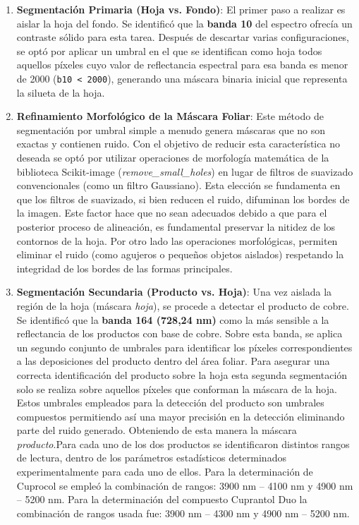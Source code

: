 \begin{enumerate}
    \item \textbf{Segmentación Primaria (Hoja vs. Fondo)}: El primer paso a realizar es aislar la hoja del fondo. Se identificó que la \textbf{banda 10} del espectro ofrecía un contraste sólido para esta tarea. Después de descartar varias configuraciones,  se optó por aplicar un umbral  en el que se identifican como hoja todos aquellos píxeles cuyo valor de reflectancia espectral para esa banda es menor de 2000 (\verb|b10 < 2000|), generando una máscara binaria inicial que representa la silueta de la hoja.

    \item \textbf{Refinamiento Morfológico de la Máscara Foliar}: Este método de segmentación por umbral simple a menudo genera máscaras que no son exactas y contienen ruido. Con el objetivo de reducir esta característica no deseada se optó por utilizar operaciones de morfología matemática de la biblioteca Scikit-image (\textit{remove\_small\_holes}) en lugar de filtros de suavizado convencionales (como un filtro Gaussiano). Esta elección se fundamenta en que los filtros de suavizado, si bien reducen el ruido, difuminan los bordes de la imagen. Este factor hace que no sean adecuados debido a que para el posterior proceso de alineación, es fundamental preservar la nitidez de los contornos de la hoja. Por otro lado las operaciones morfológicas, permiten eliminar el ruido (como agujeros o pequeños objetos aislados) respetando la integridad de los bordes de las formas principales.

    \item \textbf{Segmentación Secundaria (Producto vs. Hoja)}: Una vez aislada la región de la hoja (máscara \textit{hoja}), se procede a detectar el producto de cobre. Se identificó que la \textbf{banda 164 (728,24 nm)} como la más sensible a la reflectancia de los productos con base de cobre\cite{SANCHEZ2025101049}. Sobre esta banda, se aplica un segundo conjunto de umbrales para identificar los píxeles correspondientes a las deposiciones del producto dentro del área foliar. Para asegurar una correcta identificación del producto sobre la hoja esta segunda segmentación solo se realiza sobre aquellos píxeles que conforman la máscara de la hoja. Estos umbrales empleados para la detección del producto son umbrales compuestos permitiendo así una mayor precisión en la detección eliminando parte del ruido generado. Obteniendo de esta manera la máscara \textit{producto}.Para cada uno de los dos productos se identificaron distintos rangos de lectura, dentro de los parámetros estadísticos determinados experimentalmente para cada uno de ellos\cite{SANCHEZ2025101049}.
Para la determinación de Cuprocol se empleó la combinación de rangos: 3900 nm – 4100 nm y 4900 nm – 5200 nm. Para la determinación del compuesto Cuprantol Duo la combinación de rangos usada fue: 3900 nm – 4300 nm y 4900 nm – 5200 nm.



\end{enumerate}
